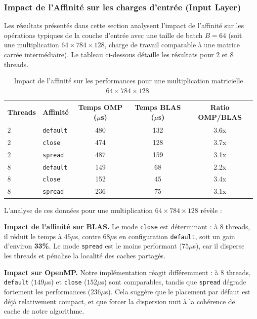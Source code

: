 \documentclass[a4paper,11pt]{article}
\begin{document}
\subsubsection{Impact de l'Affinité sur les charges d'entrée (Input Layer)}

Les résultats présentés dans cette section analysent l'impact de l'affinité sur les opérations typiques de la couche d'entrée avec une taille de batch $B=64$ (soit une multiplication $64 \times 784 \times 128$, charge de travail comparable à une matrice carrée intermédiaire). Le tableau ci-dessous détaille les résultats pour 2 et 8 threads.

\begin{table}[H]
    \centering
    \caption{Impact de l'affinité sur les performances pour une multiplication matricielle $64 \times 784 \times 128$.}
    \label{tab:affinity}
    \begin{tabular}{llccc}
        \toprule
        \textbf{Threads} & \textbf{Affinité} & \textbf{Temps OMP ($\mu$s)} & \textbf{Temps BLAS ($\mu$s)} & \textbf{Ratio OMP/BLAS} \\
        \midrule
        2 & \texttt{default} & 480 & 132 & 3.6x \\
        2 & \texttt{close} & 474 & 128 & 3.7x \\
        2 & \texttt{spread} & 487 & 159 & 3.1x \\
        \midrule
        8 & \texttt{default} & 149 & 68 & 2.2x \\
        8 & \texttt{close} & 152 & 45 & 3.4x \\
        8 & \texttt{spread} & 236 & 75 & 3.1x \\
        \bottomrule
    \end{tabular}
\end{table}

L'analyse de ces données pour une multiplication $64 \times 784 \times 128$ révèle :
\par\smallskip
\noindent\textbf{Impact de l'affinité sur BLAS.} Le mode \texttt{close} est déterminant : à 8 threads, il réduit le temps à $45 \mu$s, contre $68 \mu$s en configuration \texttt{default}, soit un gain d'environ \textbf{33\%}. Le mode \texttt{spread} est le moins performant ($75 \mu$s), car il disperse les threads et pénalise la localité des caches partagés.
\par\smallskip
\noindent\textbf{Impact sur OpenMP.} Notre implémentation réagit différemment : à 8 threads, \texttt{default} ($149 \mu$s) et \texttt{close} ($152 \mu$s) sont comparables, tandis que \texttt{spread} dégrade fortement les performances ($236 \mu$s). Cela suggère que le placement par défaut est déjà relativement compact, et que forcer la dispersion nuit à la cohérence de cache de notre algorithme.
\end{document}
